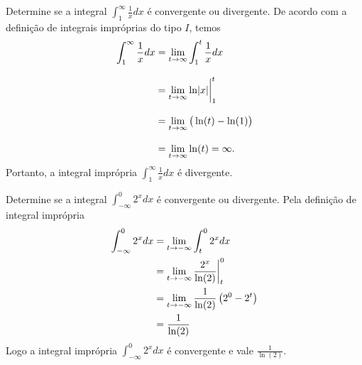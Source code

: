 \begin{example}
  Determine se a integral \(\int_1^{\infty} \frac{1}{x} dx\)
  é convergente ou divergente.
  \solution
  De acordo com a definição de integrais impróprias do tipo $I$, temos
  \begin{align*}
   \int_1^{\infty}  \frac{1}{x} dx
    & = \lim_{t \to \infty} \int_1^{t} \frac{1}{x} dx   \\[3mm]
    & = \lim_{t \to \infty} \ln\abs{x} \evalat{1}{t}    \\[3mm]
    & = \lim_{t \to \infty} \big(\ln(t)- \ln(1)\big)    \\[3mm]
    & = \lim_{t \to \infty} \ln(t)= \infty.
  \end{align*}
  Portanto, a integral imprópria \(\int_1^{\infty} \frac{1}{x}dx\)
  é divergente.
\end{example}

\begin{example}
  Determine se a integral \(\int_{-\infty}^0 2^x dx\)
  é convergente ou divergente.
  \solution
  Pela definição de integral imprópria
  \begin{align*}
    \int_{-\infty}^0 2^x dx
    & = \lim_{t \to - \infty} \int_t^{0} 2^x dx \\
    & = \lim_{t \to - \infty} \frac{2^x}{\ln(2)} \bigg\rvert_{t}^{0}  \\
    & = \lim_{t \to - \infty} \frac{1}{\ln(2)} \left( 2^0 - 2^t \right) \\
    & = \frac{1}{\ln(2)}
  \end{align*}
  Logo a integral imprópria \(\int_{-\infty}^0 2^x dx\) é convergente e vale
  \(\frac{1}{\ln(2)}\).
\end{example}

